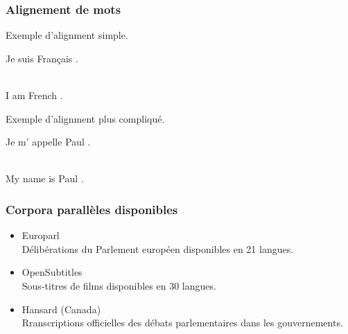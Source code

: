 \begin{frame}
\frametitle{Alignement de mots}

Exemple d'alignment simple.

\begin{center}
Je suis Français . \\
\\[-0.2em]
I am French .
\end{center}

\vspace*{1em}

Exemple d'alignment plus compliqué.

\begin{center}
Je m' appelle Paul . \\
\\[-0.2em]
My name is Paul .
\end{center}

\end{frame}

\begin{frame}
\frametitle{Corpora parallèles disponibles}

\begin{itemize}
    \item Europarl \\
    Délibérations du Parlement européen disponibles en 21 langues.
    \item OpenSubtitles\\
    Sous-titres de films disponibles en 30 langues.
    \item Hansard (Canada)\\
    Rranscriptions officielles des débats parlementaires dans les gouvernements.
\end{itemize}


\end{frame}



\begin{frame}
\frametitle{}

\end{frame}

